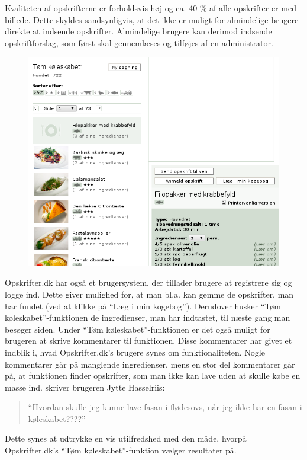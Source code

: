 Kvaliteten af opskrifterne er forholdsvis høj og ca. 40 \% af alle opskrifter er med billede. Dette skyldes sandsynligvis, at det ikke er muligt for almindelige brugere direkte at indsende opskrifter. Almindelige brugere kan derimod indsende opskriftforslag, som først skal gennemlæses og tilføjes af en administrator.

\begin{figure}
\centering
\includegraphics[scale=0.7]{billeder/forbilleder/opskrifterdk2.png}
\label{fig:opskrifterdk2}
\end{figure}

Opskrifter.dk har også et brugersystem, der tillader brugere at registrere sig og logge ind. Dette giver mulighed for, at man bl.a. kan gemme de opskrifter, man har fundet (ved at klikke på ``Læg i min kogebog''). Derudover husker ``Tøm køleskabet''-funktionen de ingredienser, man har indtastet, til næste gang man besøger siden.
Under ``Tøm køleskabet''-funktionen er det også muligt for brugeren at skrive kommentarer til funktionen. Disse kommentarer har givet et indblik i, hvad Opskrifter.dk’s brugere synes om funktionaliteten. Nogle kommentarer går på manglende ingredienser, mens en stor del kommentarer går på, at funktionen finder opskrifter, som man ikke kan lave uden at skulle købe en masse ind. \Fx skriver brugeren Jytte Hasselriis:

\begin{quote}
``Hvordan skulle jeg kunne lave fasan i flødesovs, når jeg ikke har en fasan i køleskabet????'' \cite{opskrift-fasan}
\end{quote}

Dette synes at udtrykke en vis utilfredshed med den måde, hvorpå Opskrifter.dk’s ``Tøm køleskabet''-funktion vælger resultater på.